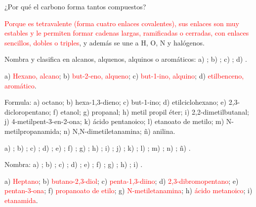 \begin{exercise}
    ¿Por qué el carbono forma tantos compuestos?
    \begin{solu}
        \textcolor{red}{Porque es tetravalente (forma cuatro enlaces covalentes), sus enlaces  son muy estables y le
        permiten formar cadenas largas, ramificadas o cerradas, con enlaces sencillos, dobles o triples}, y además se une a H, O, N y
        halógenos.
    \end{solu}
\end{exercise}

\begin{exercise}
    Nombra y clasifica en alcanos, alquenos, alquinos o aromáticos: a) ; b) ;
    c) ; d) .
    \begin{solu}
        a) \textcolor{red}{Hexano, alcano}; b) \textcolor{red}{but-2-eno, alqueno}; c) \textcolor{red}{but-1-ino, alquino};
        d) \textcolor{red}{etilbenceno, aromático}.
    \end{solu}
\end{exercise}

\begin{exercise}
    Formula: a) octano; b) hexa-1,3-dieno; c) but-1-ino; d) etilciclohexano; e) 2,3-dicloropentano; f) etanol; g) propanal;
    h) metil propil éter; i) 2,2-dimetilbutanal; j) 4-metilpent-3-en-2-ona; k) ácido pentanoico; l) etanoato de metilo;
    m) N-metilpropanamida; n) N,N-dimetiletanamina; ñ) anilina.
    \begin{solu}
        a) \textcolor{red}{}; b) \textcolor{red}{}; c) \textcolor{red}{};
        d) \textcolor{red}{}; e) \textcolor{red}{};
        f) \textcolor{red}{}; g) \textcolor{red}{}; h) \textcolor{red}{};
        i) \textcolor{red}{}; j) \textcolor{red}{};
        k) \textcolor{red}{}; l) \textcolor{red}{}; m) \textcolor{red}{};
        n) \textcolor{red}{}; ñ) \textcolor{red}{}.
    \end{solu}
\end{exercise}

\begin{exercise}
    Nombra: a) ; b) ; c) ; d) ;
    e) ; f) ; g) ; h) ; i) .
    \begin{solu}
        a) \textcolor{red}{Heptano}; b) \textcolor{red}{butano-2,3-diol}; c) \textcolor{red}{penta-1,3-diino};
        d) \textcolor{red}{2,3-dibromopentano}; e) \textcolor{red}{pentan-3-ona}; f) \textcolor{red}{propanoato de etilo};
        g) \textcolor{red}{N-metiletanamina}; h) \textcolor{red}{ácido metanoico}; i) \textcolor{red}{etanamida}.
    \end{solu}
\end{exercise}

